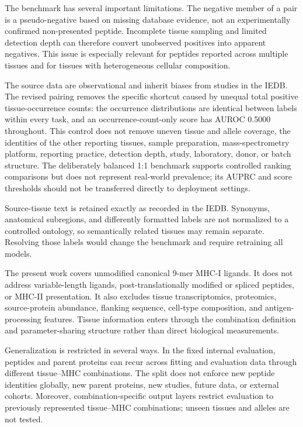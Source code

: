 The benchmark has several important limitations. The negative member of a pair is a pseudo-negative based on missing database evidence, not an experimentally confirmed non-presented peptide. Incomplete tissue sampling and limited detection depth can therefore convert unobserved positives into apparent negatives. This issue is especially relevant for peptides reported across multiple tissues and for tissues with heterogeneous cellular composition.

The source data are observational and inherit biases from studies in the IEDB. The revised pairing removes the specific shortcut caused by unequal total positive tissue-occurrence counts: the occurrence distributions are identical between labels within every task, and an occurrence-count-only score has AUROC 0.5000 throughout. This control does not remove uneven tissue and allele coverage, the identities of the other reporting tissues, sample preparation, mass-spectrometry platform, reporting practice, detection depth, study, laboratory, donor, or batch structure. The deliberately balanced 1:1 benchmark supports controlled ranking comparisons but does not represent real-world prevalence; its AUPRC and score thresholds should not be transferred directly to deployment settings.

Source-tissue text is retained exactly as recorded in the IEDB. Synonyms, anatomical subregions, and differently formatted labels are not normalized to a controlled ontology, so semantically related tissues may remain separate. Resolving those labels would change the benchmark and require retraining all models.

The present work covers unmodified canonical 9-mer MHC-I ligands. It does not address variable-length ligands, post-translationally modified or spliced peptides, or MHC-II presentation. It also excludes tissue transcriptomics, proteomics, source-protein abundance, flanking sequence, cell-type composition, and antigen-processing features. Tissue information enters through the combination definition and parameter-sharing structure rather than direct biological measurements.

Generalization is restricted in several ways. In the fixed internal evaluation, peptides and parent proteins can recur across fitting and evaluation data through different tissue--MHC combinations. The split does not enforce new peptide identities globally, new parent proteins, new studies, future data, or external cohorts. Moreover, combination-specific output layers restrict evaluation to previously represented tissue--MHC combinations; unseen tissues and alleles are not tested.

